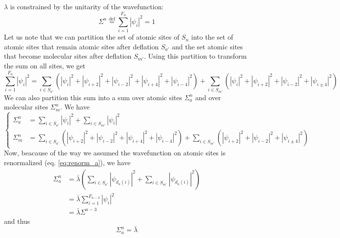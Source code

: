 \documentclass[11pt]{article}
\newcommand{\define}{\ensuremath{ \overset{\text{def}}{=} }}
\begin{document}
$\lambda$ is constrained by the unitarity of the wavefunction:
\begin{equation}
	\Sigma^n \define \sum_{i=1}^{F_n} |\psi_i|^2 = 1
\end{equation}
Let us note that we can partition the set of atomic sites of $S_n$ into the set of atomic sites that remain atomic sites after deflation $S_{a'}$ and the set atomic sites that become molecular sites after deflation $S_{m'}$.
Using this partition to transform the sum on all sites, we get
\begin{equation}
	\sum_{i=1}^{F_n} |\psi_i|^2 = \sum_{i \in S_{a'}} \left( |\psi_i|^2 + |\psi_{i+2}|^2 + |\psi_{i-2}|^2 + |\psi_{i+4}|^2 + |\psi_{i-4}|^2 \right) + \sum_{i \in S_{m'}} \left( |\psi_i|^2 + |\psi_{i+2}|^2 + |\psi_{i-2}|^2 + |\psi_{i\pm4}|^2 \right)
\end{equation}
We can also partition this sum into a sum over atomic sites $\Sigma^n_a$ and over molecular sites $\Sigma^n_m$.
We have
\begin{equation}
	\begin{cases}
	\Sigma^n_a &= \sum_{i \in S_{a'}}  |\psi_i|^2  + \sum_{i \in S_{m'}}  |\psi_i|^2\\
	\Sigma^n_m &= \sum_{i \in S_{a'}} \left( |\psi_{i+2}|^2 + |\psi_{i-2}|^2 + |\psi_{i+4}|^2 + |\psi_{i-4}|^2 \right) + \sum_{i \in S_{m'}} \left(|\psi_{i+2}|^2 + |\psi_{i-2}|^2 + |\psi_{i\pm4}|^2 \right)
	\end{cases}
\end{equation}
Now, beacause of the way we assumed the wavefunction on atomic sites is renormalized (eq. \eqref{eq:renorm_a}), we have
\begin{align}
	\Sigma_a^n &= \bar \lambda  \left(  \sum_{i \in S_{a'}}  |\psi_{d_a(i)}|^2  + \sum_{i \in S_{m'}}  |\psi_{d_a(i)}|^2 \right) \\
	&= \bar \lambda \sum_{i = 1}^{F_{n-3}} |\psi_i|^2 \\
	&= \bar \lambda \Sigma^{n-3}
\end{align}
and thus
\begin{equation}
\label{eq:renorm_aa}
\boxed{
	\Sigma_a^n = \bar \lambda
	}
\end{equation}
\end{document}

